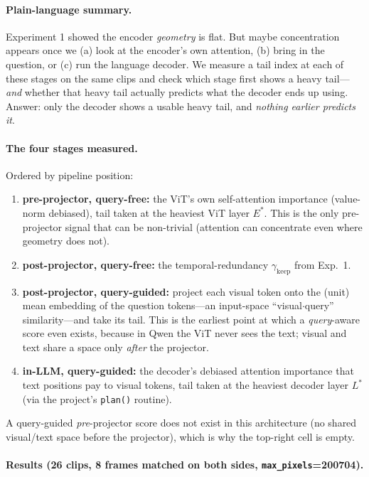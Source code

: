 \documentclass[11pt]{article}
\newcommand{\gkeep}{\gamma_{\mathrm{keep}}}
\begin{document}
\paragraph{Plain-language summary.}
Experiment 1 showed the encoder \emph{geometry} is flat. But maybe concentration
appears once we (a) look at the encoder's own attention, (b) bring in the question,
or (c) run the language decoder. We measure a tail index at each of these stages on
the same clips and check which stage first shows a heavy tail---\emph{and} whether
that heavy tail actually predicts what the decoder ends up using. Answer: only the
decoder shows a usable heavy tail, and \emph{nothing earlier predicts it}.

\paragraph{The four stages measured.} Ordered by pipeline position:
\begin{enumerate}
\item[(1)] \textbf{pre-projector, query-free:} the ViT's own self-attention
      importance (value-norm debiased), tail taken at the heaviest ViT layer
      $E^{\!*}$. This is the only pre-projector signal that can be non-trivial
      (attention can concentrate even where geometry does not).
\item[(2)] \textbf{post-projector, query-free:} the temporal-redundancy $\gkeep$
      from Exp.~1.
\item[(3)] \textbf{post-projector, query-guided:} project each visual token onto the
      (unit) mean embedding of the question tokens---an input-space
      ``visual$\cdot$query'' similarity---and take its tail. This is the earliest
      point at which a \emph{query}-aware score even exists, because in Qwen the ViT
      never sees the text; visual and text share a space only \emph{after} the
      projector.
\item[(4)] \textbf{in-LLM, query-guided:} the decoder's debiased attention
      importance that text positions pay to visual tokens, tail taken at the
      heaviest decoder layer $L^{\!*}$ (via the project's \texttt{plan()} routine).
\end{enumerate}
A query-guided \emph{pre}-projector score does not exist in this architecture (no
shared visual/text space before the projector), which is why the top-right cell is
empty.

\paragraph{Results (26 clips, 8 frames matched on both sides,
\texttt{max\_pixels}=200704).}
\end{document}
